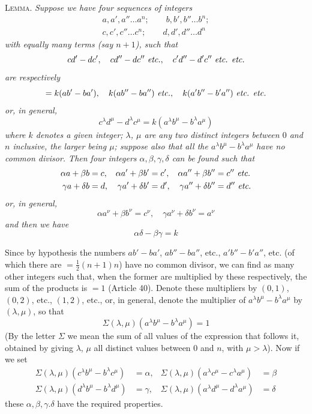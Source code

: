\textsc{Lemma.} \textit{Suppose we have four sequences of integers}
\[
\begin{gathered}a,a',a''\ldots a^n;\qquad b,b',b''\ldots b^n;\\c,c',c''\ldots c^n;\qquad d,d',d''\ldots d^n\end{gathered}
\]
\textit{with equally many terms (say $n+1$), such that}
\[
cd'-dc',\quad cd''-dc''\ \text{\textit{etc.}},\quad c'd''-d'c''\ \text{\textit{etc. etc.}}
\]
\textit{are respectively}
\[
=k(ab'-ba'),\quad k(ab''-ba'')\ \text{\textit{etc.}},\quad k(a'b''-b'a'')\ \text{\textit{etc. etc.}}
\]
\textit{or, in general,}
\[
c^\lambda d^\mu-d^\lambda c^\mu=k(a^\lambda b^\mu-b^\lambda a^\mu)
\]
\textit{where $k$ denotes a given integer; $\lambda$, $\mu$ are any two distinct integers between $0$ and $n$ inclusive, the larger being $\mu$}\textit{; suppose also that all the $a^\lambda b^\mu-b^\lambda a^\mu$ have no common divisor. Then four integers $\alpha,\beta,\gamma,\delta$ can be found such that}
\[
\begin{aligned}
\alpha a+\beta b&=c, &\alpha a'+\beta b'&=c', &\alpha a''+\beta b''&=c''\ \text{\textit{etc.}}\\
\gamma a+\delta b&=d, &\gamma a'+\delta b'&=d', &\gamma a''+\delta b''&=d''\ \text{\textit{etc.}}
\end{aligned}
\]
\textit{or, in general,}
\[
\alpha a^\nu+\beta b^\nu=c^\nu,\quad\gamma a^\nu+\delta b^\nu=a^\nu
\]
\textit{and then we have}
\[
\alpha\delta-\beta\gamma=k
\]

Since by hypothesis the numbers $ab'-ba'$, $ab''-ba''$, etc., $a'b''-b'a''$, etc. (of which there are $=\frac12(n+1)n$) have no common divisor, we can find as many other integers such that, when the former are multiplied by these respectively, the sum of the products is $=1$ (Article 40). Denote these multipliers by $(0,1)$, $(0,2)$, etc., $(1,2)$, etc., or, in general, denote the multiplier of $a^\lambda b^\mu-b^\lambda a^\mu$ by $(\lambda,\mu)$, so that
\[
\Sigma(\lambda,\mu)(a^\lambda b^\mu-b^\lambda a^\mu)=1
\]
(By the letter $\Sigma$ we mean the sum of all values of the expression that
follows it, obtained by giving $\lambda$, $\mu$ all distinct values between $0$ and $n$, with $\mu>\lambda$). Now if we set
\[
\begin{aligned}
\Sigma(\lambda,\mu)(c^\lambda b^\mu-b^\lambda c^\mu)&=\alpha, &\Sigma(\lambda,\mu)(a^\lambda c^\mu-c^\lambda a^\mu)&=\beta\\
\Sigma(\lambda,\mu)(d^\lambda b^\mu-b^\lambda d^\mu)&=\gamma, &\Sigma(\lambda,\mu)(a^\lambda d^\mu-d^\lambda a^\mu)&=\delta
\end{aligned}
\]
these $\alpha,\beta,\gamma.\delta$ have the required properties.

